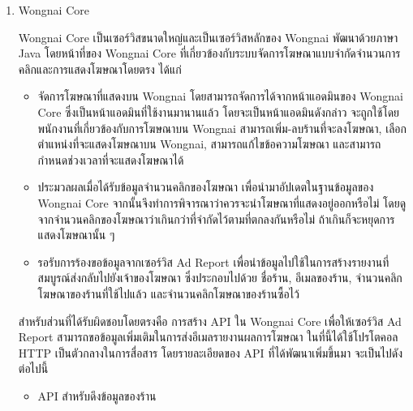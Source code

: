 \begin{enumerate}
	\item Wongnai Core
	
	Wongnai Core เป็นเซอร์วิสขนาดใหญ่และเป็นเซอร์วิสหลักของ Wongnai พัฒนาด้วยภาษา Java โดยหน้าที่ของ Wongnai Core ที่เกี่ยวข้องกับระบบจัดการโฆษณาแบบจำกัดจำนวนการคลิกและการแสดงโฆษณาโดยตรง ได้แก่
	
	\begin{itemize}
		\item จัดการโฆษณาที่แสดงบน Wongnai โดยสามารถจัดการได้จากหน้าแอดมินของ Wongnai Core ซึ่งเป็นหน้าแอดมินที่ใช้งานมานานแล้ว โดยจะเป็นหน้าแอดมินดังกล่าว จะถูกใช้โดยพนักงานที่เกี่ยวข้องกับการโฆษณาบน Wongnai สามารถเพิ่ม-ลบร้านที่จะลงโฆษณา, เลือกตำแหน่งที่จะแสดงโฆษณาบน Wongnai, สามารถแก้ไขข้อความโฆษณา และสามารถกำหนดช่วงเวลาที่จะแสดงโฆษณาได้
		\item ประมวลผลเมื่อได้รับข้อมูลจำนวนคลิกของโฆษณา เพื่อนำมาอัปเดตในฐานข้อมูลของ Wongnai Core จากนั้นจึงทำการพิจารณาว่าควรจะนำโฆษณาที่แสดงอยู่ออกหรือไม่ โดยดูจากจำนวนคลิกของโฆษณาว่าเกินกว่าที่จำกัดไว้ตามที่ตกลงกันหรือไม่ ถ้าเกินก็จะหยุดการแสดงโฆษณานั้น ๆ
		\item รอรับการร้องขอข้อมูลจากเซอร์วิส Ad Report เพื่อนำข้อมูลไปใช้ในการสร้างรายงานที่สมบูรณ์ส่งกลับไปยังเจ้าของโฆษณา ซึ่งประกอบไปด้วย ชื่อร้าน, อีเมลของร้าน, จำนวนคลิกโฆษณาของร้านที่ใช้ไปแล้ว และจำนวนคลิกโฆษณาของร้านซื้อไว้
	\end{itemize}

	สำหรับส่วนที่ได้รับผิดชอบโดยตรงคือ การสร้าง API ใน Wongnai Core เพื่อให้เซอร์วิส Ad Report สามารถขอข้อมูลเพิ่มเติมในการส่งอีเมลรายงานผลการโฆษณา ในที่นี้ได้ใช้โปรโตคอล HTTP เป็นตัวกลางในการสื่อสาร โดยรายละเอียดของ API ที่ได้พัฒนาเพิ่มขึ้นมา จะเป็นไปดังต่อไปนี้
	
	\begin{itemize}
		\item API สำหรับดึงข้อมูลของร้าน
		

\end{itemize}
\end{enumerate}
